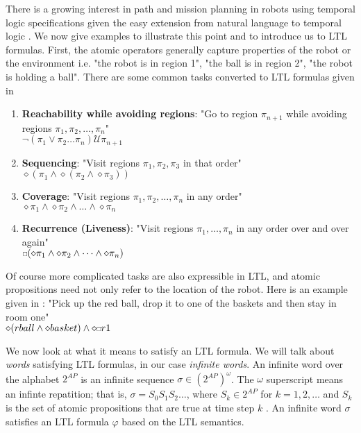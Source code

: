 There is a growing interest in path and mission planning in robots using temporal logic specifications given the easy extension from natural language to temporal logic \cite{kress07}. We now give examples to illustrate this point and to introduce us to LTL formulas. First, the atomic operators generally capture properties of the robot or the environment i.e. "the robot is in region 1", "the ball is in region 2", "the robot is holding a ball". There are some common tasks converted to LTL formulas given in \cite{fainekos09} 
\begin{enumerate}
    \item \textbf{Reachability while avoiding regions}: "Go to region $\pi_{n+1}$ while avoiding regions $\pi_1, \pi_2, \dots, \pi_n$" \\ $\neg(\pi_1 \lor \pi_2 \dots \pi_n) \mathcal{U} \pi_{n+1}$ 
    \item \textbf{Sequencing}: "Visit regions $\pi_1, \pi_2, \pi_3$ in that order"\\ 
    $\diamond (\pi_1 \land \diamond(\pi_2 \land \diamond \pi_3))$ 
    \item \textbf{Coverage}: "Visit regions $\pi_1, \pi_2, \dots, \pi_n$ in any order"\\ $\diamond \pi_1 \land \diamond \pi_2 \land \dots \land \diamond \pi_n$
    \item \textbf{Recurrence (Liveness)}: "Visit regions $\pi_1, \dots, \pi_n$ in any order over and over again"\\ $\ssquare(\diamond \pi_1 \land \diamond \pi_2 \land \dots \land \diamond \pi_n)$      
\end{enumerate}
Of course more complicated tasks are also expressible in LTL, and atomic propositions need not only refer to the location of the robot. Here is an example given in  \cite{guo15}: "Pick up the red ball, drop it to one of the baskets and then stay in room one" \\
$\diamond(rball \land \diamond basket) \land \diamond \ssquare r1$ 

We now look at what it means to satisfy an LTL formula. We will talk about \textit{words} satisfying LTL formulas, in our case \textit{infinite words}. An infinite word over the alphabet $2^{AP}$ is an infinite sequence $\sigma \in (2^{AP})^\omega$. The $\omega$ superscript means an infinte repatition; that is, $\sigma = S_0 S_1 S_2 \dots$, where $S_k \in 2^{AP}$ for $k=1,2,\dots$ and $S_k$ is the set of atomic propositions that are true at time step $k$ \cite{guo15}. An infinite word $\sigma$ satisfies an LTL formula $\varphi$ based on the LTL semantics.  

